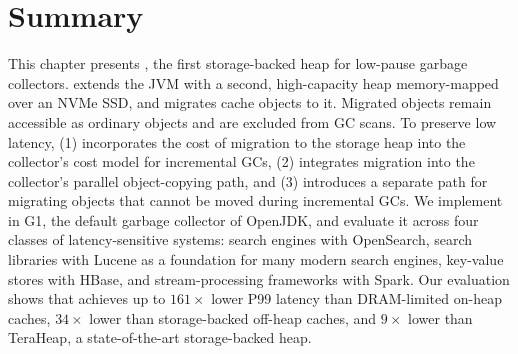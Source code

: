 \section{Summary}
This chapter presents \chipperName{}, the first storage-backed heap for low-pause garbage collectors.
\chipperName{} extends the JVM with a second, high-capacity heap memory-mapped over an NVMe SSD, and migrates cache objects to it.
Migrated objects remain accessible as ordinary objects and are excluded from GC scans.
To preserve low latency, \chipperName{} (1) incorporates the cost of migration to the storage heap into the collector's cost model for incremental GCs, (2) integrates migration into the collector's parallel object-copying path, and (3) introduces a separate path for migrating objects that cannot be moved during incremental GCs.
We implement \chipperName{} in G1, the default garbage collector of OpenJDK, and evaluate it across four classes of latency-sensitive systems: search engines with OpenSearch, search libraries with Lucene as a foundation for many modern search engines, key-value stores with HBase, and stream-processing frameworks with Spark.
Our evaluation shows that \chipperName{} achieves up to $161\times$ lower P99 latency than DRAM-limited on-heap caches, $34\times$ lower than storage-backed off-heap caches, and $9\times$ lower than TeraHeap, a state-of-the-art storage-backed heap.
